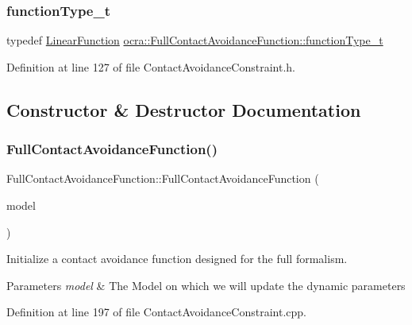 \subsubsection{\texorpdfstring{function\+Type\+\_\+t}{functionType\_t}}
{\footnotesize\ttfamily typedef \hyperlink{classocra_1_1LinearFunction}{Linear\+Function} \hyperlink{classocra_1_1FullContactAvoidanceFunction_a9b59cb139be82095188084893d70b996}{ocra\+::\+Full\+Contact\+Avoidance\+Function\+::function\+Type\+\_\+t}}



Definition at line 127 of file Contact\+Avoidance\+Constraint.\+h.



\subsection{Constructor \& Destructor Documentation}
\hypertarget{classocra_1_1FullContactAvoidanceFunction_aa1632bec7158003ab2da17f71aa134e0}{}\label{classocra_1_1FullContactAvoidanceFunction_aa1632bec7158003ab2da17f71aa134e0} 
\subsubsection{\texorpdfstring{Full\+Contact\+Avoidance\+Function()}{FullContactAvoidanceFunction()}}
{\footnotesize\ttfamily Full\+Contact\+Avoidance\+Function\+::\+Full\+Contact\+Avoidance\+Function (\begin{DoxyParamCaption}\item[{const Model \&}]{model }\end{DoxyParamCaption})}

Initialize a contact avoidance function designed for the full formalism.


\begin{DoxyParams}{Parameters}
{\em model} & The Model on which we will update the dynamic parameters \\
\hline
\end{DoxyParams}


Definition at line 197 of file Contact\+Avoidance\+Constraint.\+cpp.

\hypertarget{classocra_1_1FullContactAvoidanceFunction_abf414a050f3b16c4a095049937335c96}{}\label{classocra_1_1FullContactAvoidanceFunction_abf414a050f3b16c4a095049937335c96} 
